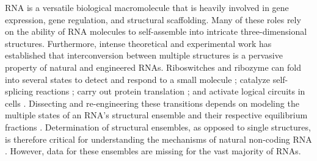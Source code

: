 \documentclass[12pt]{article}
\begin{document}
RNA is a versatile biological macromolecule that is heavily involved in gene expression, gene regulation, and structural scaffolding.
Many of these roles rely on the ability of RNA molecules to self-assemble into intricate three-dimensional structures. 
Furthermore, intense theoretical and experimental work has established that interconversion between multiple structures is a pervasive property of natural and engineered RNAs. 
Riboswitches and ribozyme can fold into several states to detect and respond to a small molecule  \cite{Mandal2004,Winkler2003}; catalyze self-splicing reactions \cite{Cate1996,Kennedy2013,Soukup1999}; carry out protein translation \cite{Ban2000,Nissen2000, Muth2000}; and activate logical circuits in cells \cite{Win2008,Lucks2008}. 
Dissecting and re-engineering these transitions depends on modeling the multiple states of an RNA's structural ensemble and their respective equilibrium fractions \cite{Reining2013}. 
Determination of structural ensembles, as opposed to single structures, is therefore critical for understanding the mechanisms of natural non-coding RNA \cite{Reining2013,Villordo2010}.
However, data for these ensembles are missing for the vast majority of RNAs.  
\end{document}
